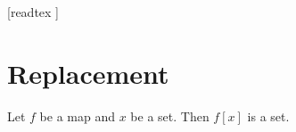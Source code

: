 \documentclass[10pt]{article}
\begin{document}
  \begin{imports}
    \begin{forthel}
      [readtex ]
    \end{forthel}
  \end{imports}


  \section{Replacement}

  \begin{forthel}
    \begin{axiom}
      Let $f$ be a map and $x$ be a set.
      Then $f[x]$ is a set.
    \end{axiom}
  \end{forthel}
\end{document}
